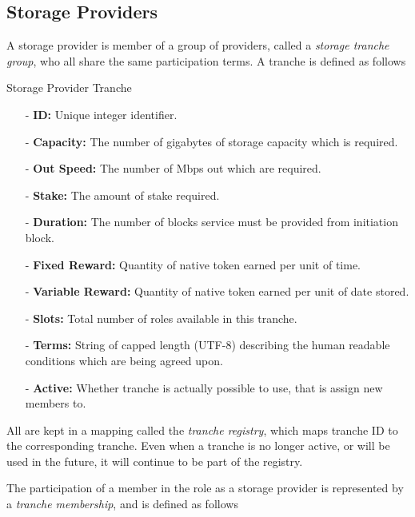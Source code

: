 \documentclass{article}
\newenvironment{concept_box}[1]
    {
    \begin{tcolorbox}
    {\large \textbf{#1} }
    }
    {
    \end{tcolorbox}
    }
\begin{document}
\subsection{Storage Providers}

A storage provider is member of a group of providers, called a \textit{storage tranche group}, who all share the same participation terms. A tranche is defined as follows \\

\begin{concept_box}{Storage Provider Tranche}
    \begin{itemize}
      \item[-] \textbf{ID:} Unique integer identifier.
      \item[-] \textbf{Capacity:} The number of gigabytes of storage capacity which is required.
      \item[-] \textbf{Out Speed:} The number of Mbps out which are required.
      \item[-] \textbf{Stake:} The amount of stake required.
      \item[-] \textbf{Duration:} The number of blocks service must be provided from initiation block.
      \item[-] \textbf{Fixed Reward:} Quantity of native token earned per unit of time.
      \item[-] \textbf{Variable Reward:} Quantity of native token earned per unit of date stored.
      \item[-] \textbf{Slots:} Total number of roles available in this tranche.
      \item[-] \textbf{Terms:} String of capped length (UTF-8) describing the human readable conditions which are being agreed upon.
      \item[-] \textbf{Active:} Whether tranche is actually possible to use, that is assign new members to.
    \end{itemize}
\end{concept_box}

All are kept in a mapping called the \textit{tranche registry}, which maps tranche ID to the corresponding tranche. Even when a tranche is no longer active, or will be used in the future, it will continue to be part of the registry.

The participation of a member in the role as a storage provider is represented by a \textit{tranche membership}, and is defined as follows \\
\end{document}
